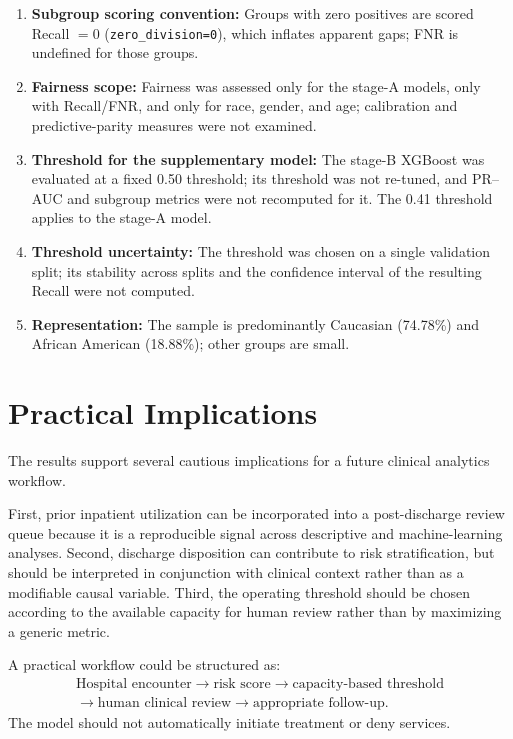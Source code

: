 \documentclass[10pt,a4paper]{article}
\begin{document}
\begin{enumerate}[leftmargin=1.2cm]
\item \textbf{Subgroup scoring convention:} Groups with zero positives are scored Recall $=0$ (\texttt{zero\_division=0}), which inflates apparent gaps; FNR is undefined for those groups.
\item \textbf{Fairness scope:} Fairness was assessed only for the stage-A models, only with Recall/FNR, and only for race, gender, and age; calibration and predictive-parity measures were not examined.
\item \textbf{Threshold for the supplementary model:} The stage-B XGBoost was evaluated at a fixed 0.50 threshold; its threshold was not re-tuned, and PR--AUC and subgroup metrics were not recomputed for it. The 0.41 threshold applies to the stage-A model.
\item \textbf{Threshold uncertainty:} The threshold was chosen on a single validation split; its stability across splits and the confidence interval of the resulting Recall were not computed.
\item \textbf{Representation:} The sample is predominantly Caucasian (74.78\%) and African American (18.88\%); other groups are small.
\end{enumerate}

\section{Practical Implications}

The results support several cautious implications for a future clinical analytics workflow.

First, prior inpatient utilization can be incorporated into a post-discharge review queue because it is a reproducible signal across descriptive and machine-learning analyses. Second, discharge disposition can contribute to risk stratification, but should be interpreted in conjunction with clinical context rather than as a modifiable causal variable. Third, the operating threshold should be chosen according to the available capacity for human review rather than by maximizing a generic metric.

A practical workflow could be structured as:
\[
\begin{gathered}
\text{Hospital encounter}
\rightarrow
\text{risk score}
\rightarrow
\text{capacity-based threshold}\\
\rightarrow
\text{human clinical review}
\rightarrow
\text{appropriate follow-up}.
\end{gathered}
\]
The model should not automatically initiate treatment or deny services.
\end{document}
